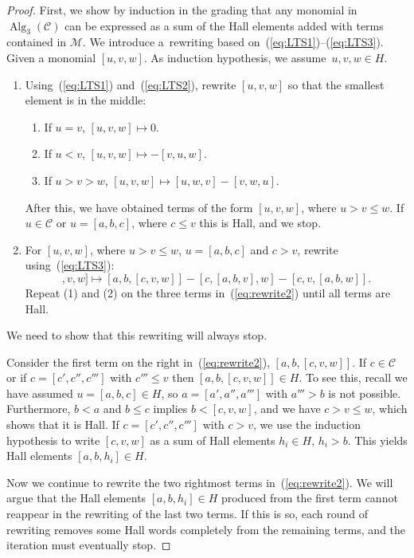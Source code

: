 \documentclass[10pt,a4paper]{amsart}
\newcommand{\refp}[1]{(\ref{#1})}
\newcommand*{\Alg}{\operatorname{Alg}}
\numberwithin{equation}{section}
\begin{document}
\begin{proof}
First, we show by induction in the grading that any monomial in $\Alg_3(\mathcal{C})$ can be expressed as a sum of the Hall elements added with terms contained in $\mathcal{M}$.
We introduce a~rewriting based on~\refp{eq:LTS1}--\refp{eq:LTS3}.
Given a monomial $[u,v,w]$. As induction hypothesis, we assume~$u,v,w\in H$.
\begin{enumerate}\itemsep=0pt
\item[(1)] Using~\refp{eq:LTS1} and~\refp{eq:LTS2}, rewrite $[u,v,w]$ so that the smallest element is in the middle:
 \begin{enumerate}\itemsep=0pt
 \item If $u=v$, $[u,v,w]\mapsto 0$.
 \item If $u<v$, $[u,v,w]\mapsto -[v,u,w]$.
 \item If $u>v> w$, $[u,v,w] \mapsto [u,w,v]-[v,w,u]$.
 \end{enumerate}
 After this, we have obtained terms of the form $[u,v,w]$, where $u>v\leq w$. If $u\in \mathcal{C}$ or $u=[a,b,c]$, where $c\leq v$ this is Hall, and we stop.
\item[(2)] For $[u,v,w]$, where $u>v\leq w$, $u=[a,b,c]$ and $c>v$, rewrite using~\refp{eq:LTS3}:
\begin{equation}
[[a,b,c],v,w] \mapsto [a,b,[c,v,w]] - [c,[a,b,v],w] - [c,v,[a,b,w]]. \label{eq:rewrite2}
\end{equation}
Repeat (1) and (2) on the three terms in~\refp{eq:rewrite2} until all terms are Hall.
\end{enumerate}
We need to show that this rewriting will always stop.

Consider the first term on the right in~\refp{eq:rewrite2}, $[a,b,[c,v,w]]$.
If $c\in \mathcal{C}$ or if $c=[c',c'',c''']$ with $c'''\leq v$ then $[a,b,[c,v,w]]\in H$. To see this, recall we have assumed $u=[a,b,c]\in H$, so $a = [a',a'',a''']$ with $a'''>b$ is not possible. Furthermore, $b<a$ and $b\leq c$ implies $b< [c,v,w]$, and we have $c>v\leq w$, which shows that it is Hall. If $c=[c',c'',c''']$ with $c> v$, we use the induction hypothesis to write $[c,v,w]$ as a sum of
Hall elements $h_i\in H$, $h_i>b$. This yields Hall elements $[a,b,h_i]\in H$.

Now we continue to rewrite the two rightmost terms in~\refp{eq:rewrite2}. We will argue that the Hall elements
$[a,b,h_i]\in H$ produced from the first term cannot reappear in the rewriting of the last two terms. If this is so, each round of rewriting removes some Hall words completely from the remaining terms, and the iteration must eventually stop.


\end{proof}
\end{document}
